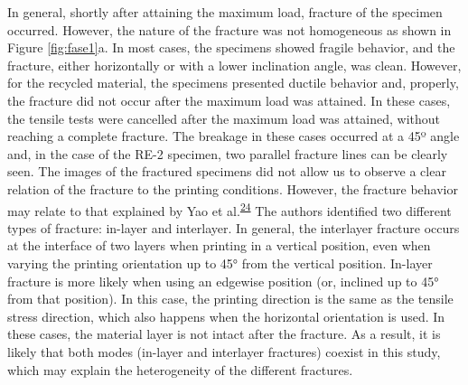 \documentclass[
  12pt]{article}
\begin{document}
In general, shortly after attaining the maximum load, fracture of the specimen occurred. However, the nature of the fracture was not homogeneous as shown in Figure \ref{fig:fase1}a.
In most cases, the specimens showed fragile behavior, and the fracture, either horizontally or with a lower inclination angle, was clean.
However, for the recycled material, the specimens presented ductile behavior and, properly, the fracture did not occur after the maximum load was attained.
In these cases, the tensile tests were cancelled after the maximum load was attained, without reaching a complete fracture.
The breakage in these cases occurred at a 45º angle and, in the case of the RE-2 specimen, two parallel fracture lines can be clearly seen.
The images of the fractured specimens did not allow us to observe a clear relation of the fracture to the printing conditions.
However, the fracture behavior may relate to that explained by Yao et al.\textsuperscript{\protect\hyperlink{ref-Yao2019}{24}}
The authors identified two different types of fracture: in-layer and interlayer.
In general, the interlayer fracture occurs at the interface of two layers when printing in a vertical position, even when varying the printing orientation up to 45° from the vertical position.
In-layer fracture is more likely when using an edgewise position (or, inclined up to 45° from that position).
In this case, the printing direction is the same as the tensile stress direction, which also happens when the horizontal orientation is used.
In these cases, the material layer is not intact after the fracture.
As a result, it is likely that both modes (in-layer and interlayer fractures) coexist in this study, which may explain the heterogeneity of the different fractures.
\end{document}
